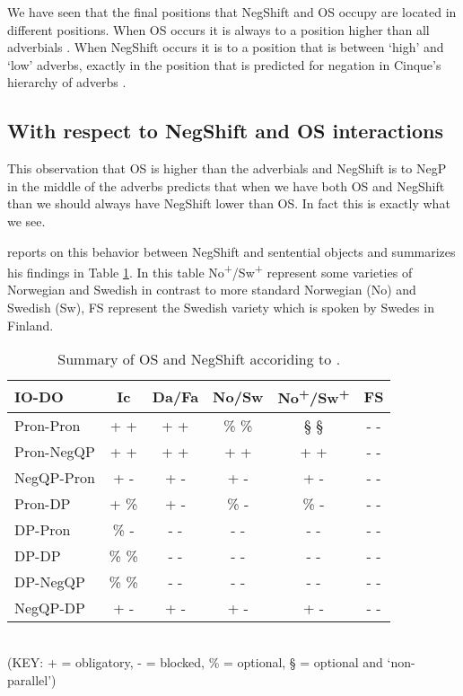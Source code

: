 \documentclass[12pt, letterpaper]{article}
\begin{document}
We have seen that the final positions that NegShift and OS occupy are located in different positions. When OS occurs it is always to a position higher than all adverbials \citep{holmbergWordOrderSyntactic1986,holmbergRemarksHolmbergGeneralization1999}. When NegShift occurs it is to a position that is between `high' and `low' adverbs, exactly in the position that is predicted for negation in Cinque's hierarchy of adverbs \citep{nilsenAdverbsAshift1997,svenoniusStrainsNegationNorwegian2002}. 

\subsection{With respect to NegShift and OS interactions} \label{sec:INTERACTION}

This observation that OS is higher than the adverbials and NegShift is to NegP in the middle of the adverbs predicts that when we have both OS and NegShift than we should always have NegShift lower than OS. In fact this is exactly what we see.

\citet{christensenInterfacesNegationSyntax2005} reports on this behavior between NegShift and sentential objects and summarizes his findings in Table \ref{tab:OSNEGS}. In this table No\textsuperscript{+}/Sw\textsuperscript{+} represent some varieties of Norwegian and Swedish in contrast to more standard Norwegian (No) and Swedish (Sw), FS represent the Swedish variety which is spoken by Swedes in Finland.
\begin{table}[h!]
\centering
\caption{Summary of OS and NegShift accoriding to \citet{christensenInterfacesNegationSyntax2005}.}
\label{tab:OSNEGS}
\begin{tabular}{lccccc}
\hline
IO-DO & Ic & Da/Fa & No/Sw & No\textsuperscript{+}/Sw\textsuperscript{+} & FS  \\
\hline 
Pron-Pron	&	+ +	&	+ +	&	\% \%	&	§ §	&	- -	\\
Pron-NegQP	&	+ +	&	+ +	&	+ +	&	+ +	&	- -	\\
NegQP-Pron	&	+ -	&	+ -	&	+ -	&	+ -	&	- -	\\
Pron-DP	&	+ \%	&	+ -	&	\% -	&	\% -	&	- -	\\
DP-Pron	&	\% -	&	- -	&	- -	&	- -	&	- -	\\
DP-DP	&	\% \%	&	- -	&	- -	&	- -	&	- -	\\
DP-NegQP	&	\% \%	&	- -	&	- -	&	- -	&	- -	\\
NegQP-DP	&	+ -	&	+ -	&	+ -	&	+ -	&	- -	\\
\hline 
\end{tabular}\\
(KEY: + = obligatory, - = blocked, \% = optional, § = optional and `non-parallel’)
\end{table}
\end{document}

